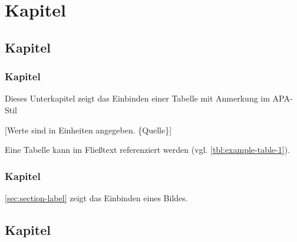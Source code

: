 \chapter{Kapitel}

\section{Kapitel}

\subsection{Kapitel}

Dieses Unterkapitel zeigt das Einbinden einer Tabelle mit Anmerkung im APA-Stil \parencite{AmericanPsychologicalAssociation2020}

[Werte sind in Einheiten angegeben. \{Quelle\}]

Eine Tabelle kann im Fließtext referenziert werden (vgl. \autoref{tbl:example-table-1}).

\subsection{Kapitel}

\autoref{sec:section-label} zeigt das Einbinden eines Bildes.

\section{Kapitel}

